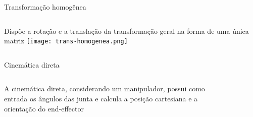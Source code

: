 \begin{frame}[c]{Transformação homogênea}
    \begin{columns}

        Dispõe a rotação e a translação da transformação geral na forma de uma única matriz
            \centering
            \texttt{[image: trans-homogenea.png]}
    \end{columns}
\end{frame}
\begin{frame}[c]{} 
   
    \begin{center}
    \end{center}
       
\end{frame}
\begin{frame}[t]{Cinemática direta} 
    
    \begin{columns}[c]
        A cinemática direta, considerando um manipulador, possui como 
        entrada os ângulos das junta e calcula a posição cartesiana e 
        a orientação do end-effector 
            \begin{figure}
            \end{figure}
    \end{columns}
\end{frame}
